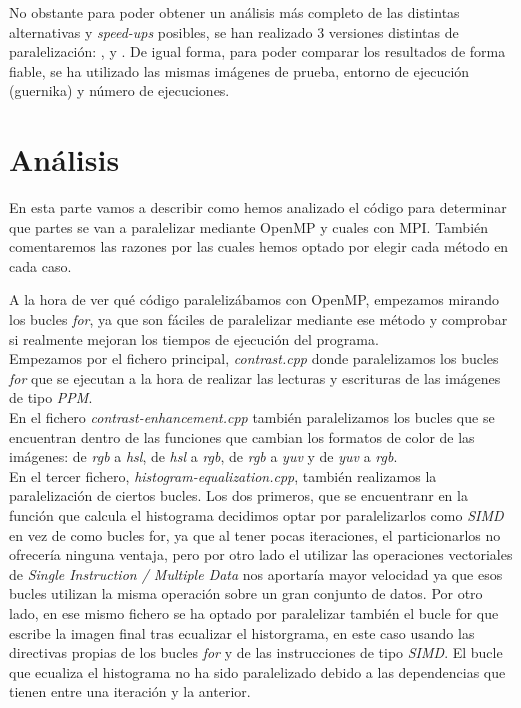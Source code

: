 \documentclass[12pt]{report} %
\begin{document}
No obstante para poder obtener un análisis más completo de las distintas alternativas y \textit{speed-ups} posibles, se han realizado 3 versiones distintas de paralelización: ,  y . De igual forma, para poder comparar los resultados de forma fiable, se ha utilizado las mismas imágenes de prueba, entorno de ejecución (guernika) y número de ejecuciones.

\section{Análisis}


En esta parte vamos a describir como hemos analizado el código para determinar que partes se van a paralelizar mediante OpenMP y cuales con MPI.	También comentaremos las razones por las cuales hemos optado por elegir cada método en cada caso.

\par A la hora de ver qué código paralelizábamos con OpenMP, empezamos mirando los bucles \textit{for}, ya que son fáciles de paralelizar mediante ese método y comprobar si realmente mejoran los tiempos de ejecución del programa. \\ Empezamos por el fichero principal, \textit{contrast.cpp} donde paralelizamos los bucles \textit{for} que se ejecutan a la hora de realizar las lecturas y escrituras de las imágenes de tipo \textit{PPM}.\\ En el fichero \textit{contrast-enhancement.cpp} también paralelizamos los bucles que se encuentran dentro de las funciones que cambian los formatos de color de las imágenes: de \textit{rgb} a \textit{hsl}, de \textit{hsl} a \textit{rgb}, de \textit{rgb} a \textit{yuv} y de \textit{yuv} a \textit{rgb}.\\ En el tercer fichero, \textit{histogram-equalization.cpp}, también realizamos la paralelización de ciertos bucles. Los dos primeros, que se encuentranr en la función que calcula el histograma decidimos optar por paralelizarlos como \textit{SIMD} en vez de como bucles for, ya que al tener pocas iteraciones, el particionarlos no ofrecería ninguna ventaja, pero por otro lado el utilizar las operaciones vectoriales de \textit{Single Instruction / Multiple Data} nos aportaría mayor velocidad ya que esos bucles utilizan la misma operación sobre un gran conjunto de datos. Por otro lado, en ese mismo fichero se ha optado por paralelizar también el bucle for que escribe la imagen final	tras ecualizar el historgrama, en este caso usando las directivas propias de los bucles \textit{for} y de las instrucciones de tipo \textit{SIMD}. El bucle que ecualiza el histograma no ha sido paralelizado debido a las dependencias que tienen entre una iteración y la anterior.
\end{document}
